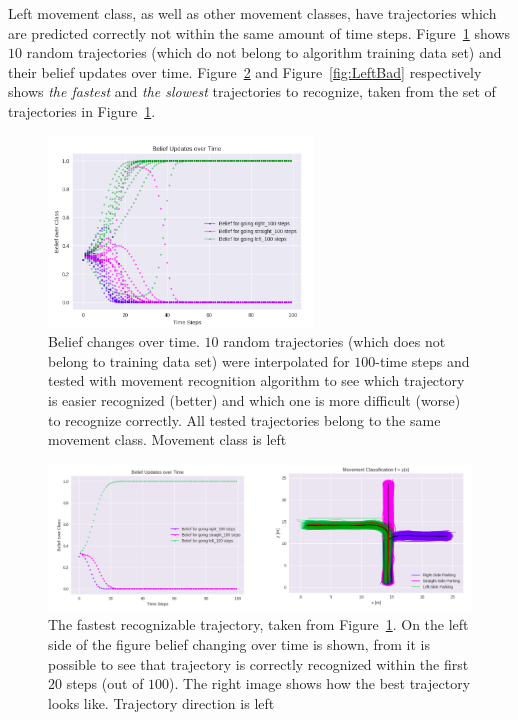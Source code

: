 
Left movement class, as well as other movement classes, have trajectories which are predicted correctly not within the same amount of time steps. Figure~\ref{fig:10Left} shows $10$ random trajectories (which do not belong to algorithm training data set) and their belief updates over time. Figure~\ref{fig:LeftGood} and Figure~\ref{fig:LeftBad} respectively shows \textit{the fastest} and \textit{the slowest} trajectories to recognize, taken from the set of trajectories in Figure~\ref{fig:10Left}.

\begin{figure}[H]
	\centering  	
	\includegraphics[width=7cm]{img/10left.png}
	\caption{Belief changes over time. $10$ random trajectories (which does not belong to training data set) were interpolated for $100$-time steps and tested with movement recognition algorithm to see which trajectory is easier recognized (better) and which one is more difficult (worse) to recognize correctly. All tested trajectories belong to the same movement class. Movement class is left}
	\label{fig:10Left}    
\end{figure}

\begin{figure}[H]
	\centering  	
	\includegraphics[width=13cm]{img/goodleft.png}
	\caption{The fastest recognizable trajectory, taken from Figure~\ref{fig:10Left}. On the left side of the figure belief changing over time is shown, from it is possible to see that trajectory is correctly recognized within the first $20$ steps (out of $100$). The right image shows how the best trajectory looks like. Trajectory direction is left}
	\label{fig:LeftGood}    
\end{figure}

